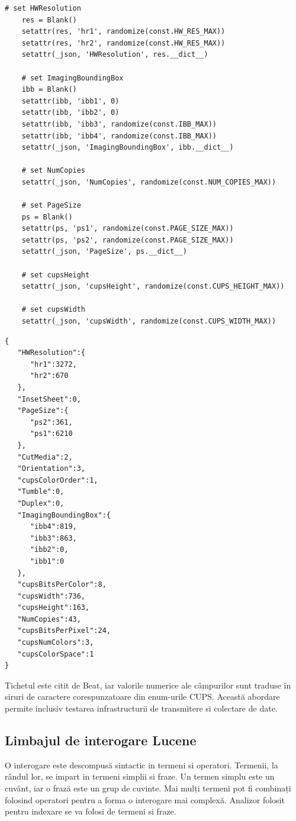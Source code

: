 \documentclass[12pt]{report}
\begin{document}
\begin{lstlisting}[caption={cazurile speciale, tratate individual - Python},captionpos=b]
# set HWResolution        
    res = Blank()
    setattr(res, 'hr1', randomize(const.HW_RES_MAX))
    setattr(res, 'hr2', randomize(const.HW_RES_MAX))
    setattr(_json, 'HWResolution', res.__dict__)

    # set ImagingBoundingBox
    ibb = Blank()
    setattr(ibb, 'ibb1', 0)
    setattr(ibb, 'ibb2', 0)
    setattr(ibb, 'ibb3', randomize(const.IBB_MAX))
    setattr(ibb, 'ibb4', randomize(const.IBB_MAX))
    setattr(_json, 'ImagingBoundingBox', ibb.__dict__)

    # set NumCopies
    setattr(_json, 'NumCopies', randomize(const.NUM_COPIES_MAX))

    # set PageSize
    ps = Blank()
    setattr(ps, 'ps1', randomize(const.PAGE_SIZE_MAX))
    setattr(ps, 'ps2', randomize(const.PAGE_SIZE_MAX))
    setattr(_json, 'PageSize', ps.__dict__)

    # set cupsHeight
    setattr(_json, 'cupsHeight', randomize(const.CUPS_HEIGHT_MAX))

    # set cupsWidth
    setattr(_json, 'cupsWidth', randomize(const.CUPS_WIDTH_MAX))
\end{lstlisting}
\begin{lstlisting}[caption={exemplu de output pentru programul de mai sus - JSON},captionpos=b]
{  
   "HWResolution":{  
      "hr1":3272,
      "hr2":670
   },
   "InsetSheet":0,
   "PageSize":{  
      "ps2":361,
      "ps1":6210
   },
   "CutMedia":2,
   "Orientation":3,
   "cupsColorOrder":1,
   "Tumble":0,
   "Duplex":0,
   "ImagingBoundingBox":{  
      "ibb4":819,
      "ibb3":863,
      "ibb2":0,
      "ibb1":0
   },
   "cupsBitsPerColor":8,
   "cupsWidth":736,
   "cupsHeight":163,
   "NumCopies":43,
   "cupsBitsPerPixel":24,
   "cupsNumColors":3,
   "cupsColorSpace":1
}
\end{lstlisting}
Tichetul este citit de Beat, iar valorile numerice ale câmpurilor sunt traduse în siruri de caractere corespunzatoare din enum-urile CUPS. 
Această abordare permite inclusiv testarea infrastructurii de transmitere si colectare de date.

	\subsection{Limbajul de interogare Lucene}
O interogare este descompusă sintactic in termeni si operatori. Termenii, la rândul lor, se impart in termeni simplii si fraze. Un termen simplu este un cuvânt, iar o frază este un grup de cuvinte. Mai mulți termeni pot fi combinați folosind operatori pentru a forma o interogare mai complexă. Analizor folosit pentru indexare se va folosi de termeni si fraze.
\end{document}
